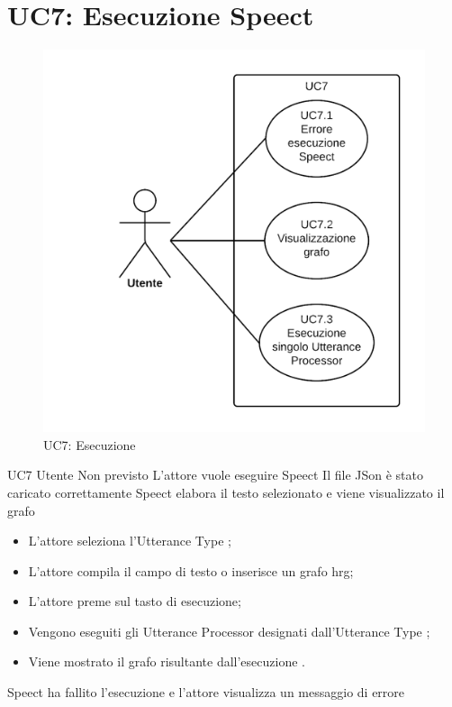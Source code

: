 \documentclass[../AnalisideiRequisiti.tex]{subfiles}
\begin{document}
\section{UC7: Esecuzione Speect}
\begin{figure}[H]
	\centering
	\includegraphics[width=\textwidth]{../img/UC7.png}
	\caption{UC7: Esecuzione}
\end{figure}
\UserCase
{UC7}
{Utente}
{Non previsto}
{L'attore vuole eseguire Speect}
{Il file JSon è stato caricato correttamente }
{Speect elabora il testo selezionato e viene visualizzato il grafo}
{\begin{itemize}
		\item{} L'attore seleziona l'Utterance Type ;
		\item{} L'attore compila il campo di testo o inserisce un grafo hrg;
		\item{} L'attore preme sul tasto di esecuzione;
		\item{} Vengono eseguiti gli Utterance Processor designati dall'Utterance Type ;
		\item{} Viene mostrato il grafo risultante dall'esecuzione .
	\end{itemize}
}
{Speect ha fallito l'esecuzione e l'attore visualizza un messaggio di errore }
\end{document}
